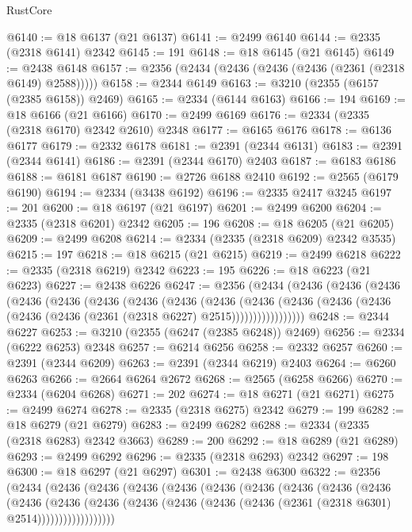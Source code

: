 \begin{lexlean}{RustCore}
\begin{coremodule}
@6140 := @18 @6137 (@21 @6137)
@6141 := @2499 @6140
@6144 := @2335 (@2318 @6141) @2342
@6145 := 191
@6148 := @18 @6145 (@21 @6145)
@6149 := @2438 @6148
@6157 := @2356 (@2434 (@2436 (@2436 (@2436 (@2361 (@2318 @6149) @2588)))))
@6158 := @2344 @6149
@6163 := @3210 (@2355 (@6157 (@2385 @6158)) @2469)
@6165 := @2334 (@6144 @6163)
@6166 := 194
@6169 := @18 @6166 (@21 @6166)
@6170 := @2499 @6169
@6176 := @2334 (@2335 (@2318 @6170) @2342 @2610) @2348
@6177 := @6165 @6176
@6178 := @6136 @6177
@6179 := @2332 @6178
@6181 := @2391 (@2344 @6131)
@6183 := @2391 (@2344 @6141)
@6186 := @2391 (@2344 @6170) @2403
@6187 := @6183 @6186
@6188 := @6181 @6187
@6190 := @2726 @6188 @2410
@6192 := @2565 (@6179 @6190)
@6194 := @2334 (@3438 @6192)
@6196 := @2335 @2417 @3245
@6197 := 201
@6200 := @18 @6197 (@21 @6197)
@6201 := @2499 @6200
@6204 := @2335 (@2318 @6201) @2342
@6205 := 196
@6208 := @18 @6205 (@21 @6205)
@6209 := @2499 @6208
@6214 := @2334 (@2335 (@2318 @6209) @2342 @3535)
@6215 := 197
@6218 := @18 @6215 (@21 @6215)
@6219 := @2499 @6218
@6222 := @2335 (@2318 @6219) @2342
@6223 := 195
@6226 := @18 @6223 (@21 @6223)
@6227 := @2438 @6226
@6247 := @2356
    (@2434
      (@2436
        (@2436
          (@2436
            (@2436
              (@2436
                (@2436
                  (@2436
                    (@2436
                      (@2436
                        (@2436
                          (@2436
                            (@2436 (@2436 (@2436 (@2436 (@2361 (@2318 @6227) @2515)))))))))))))))))
@6248 := @2344 @6227
@6253 := @3210 (@2355 (@6247 (@2385 @6248)) @2469)
@6256 := @2334 (@6222 @6253) @2348
@6257 := @6214 @6256
@6258 := @2332 @6257
@6260 := @2391 (@2344 @6209)
@6263 := @2391 (@2344 @6219) @2403
@6264 := @6260 @6263
@6266 := @2664 @6264 @2672
@6268 := @2565 (@6258 @6266)
@6270 := @2334 (@6204 @6268)
@6271 := 202
@6274 := @18 @6271 (@21 @6271)
@6275 := @2499 @6274
@6278 := @2335 (@2318 @6275) @2342
@6279 := 199
@6282 := @18 @6279 (@21 @6279)
@6283 := @2499 @6282
@6288 := @2334 (@2335 (@2318 @6283) @2342 @3663)
@6289 := 200
@6292 := @18 @6289 (@21 @6289)
@6293 := @2499 @6292
@6296 := @2335 (@2318 @6293) @2342
@6297 := 198
@6300 := @18 @6297 (@21 @6297)
@6301 := @2438 @6300
@6322 := @2356
    (@2434
      (@2436
        (@2436
          (@2436
            (@2436
              (@2436
                (@2436
                  (@2436
                    (@2436
                      (@2436
                        (@2436
                          (@2436
                            (@2436
                              (@2436
                                (@2436 (@2436 (@2436 (@2361 (@2318 @6301) @2514))))))))))))))))))

\end{coremodule}
\end{lexlean}
